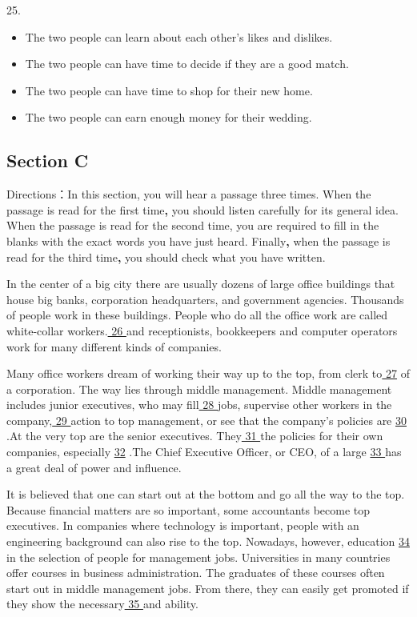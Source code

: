 \documentclass[UTF8,11pt]{ctexart}
\begin{document}
25.


\begin{itemize}[leftmargin=2em,itemsep=.2em,topsep=.4em]\item[A.] The two people can learn about each other’s likes and dislikes.
\item[B.] The two people can have time to decide if they are a good match.
\item[C.] The two people can have time to shop for their new home.
\end{itemize}

\begin{itemize}[leftmargin=2em,itemsep=.2em,topsep=.4em]\item[D.] The two people can earn enough money for their wedding.
\end{itemize}

\subsection*{\textbf{Section C}}


Directions：In this section, you will hear a passage three times. When the passage is read for the first time\textbf{,} you should listen carefully for its general idea. When the passage is read for the second time, you are required to fill in the blanks with the exact words you have just heard. Finally\textbf{,} when the passage is read for the third time\textbf{,} you should check what you have written.


In the center of a big city there are usually dozens of large office buildings that house big banks, corporation headquarters, and government agencies. Thousands of people work in these buildings. People who do all the office work are called white-collar workers.\uline{ 26 }and receptionists, bookkeepers and computer operators work for many different kinds of companies.


Many office workers dream of working their way up to the top, from clerk to\uline{ 27} of a corporation. The way lies through middle management. Middle management includes junior executives, who may fill\uline{ 28 }jobs, supervise other workers in the company,\uline{ 29 }action to top management, or see that the company’s policies are \uline{30} .At the very top are the senior executives. They\uline{ 31 }the policies for their own companies, especially \uline{32} .The Chief Executive Officer, or CEO, of a large \uline{33 }has a great deal of power and influence.


It is believed that one can start out at the bottom and go all the way to the top. Because financial matters are so important, some accountants become top executives. In companies where technology is important, people with an engineering background can also rise to the top. Nowadays, however, education \uline{34} in the selection of people for management jobs. Universities in many countries offer courses in business administration. The graduates of these courses often start out in middle management jobs. From there, they can easily get promoted if they show the necessary\uline{ 35 }and ability.
\end{document}
